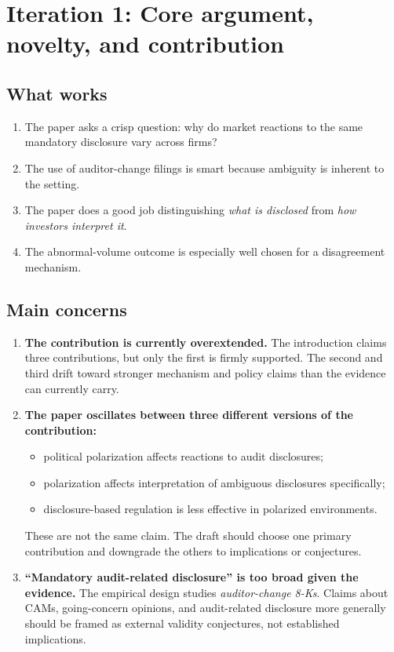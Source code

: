 \documentclass[11pt]{article}
\begin{document}
\section*{Iteration 1: Core argument, novelty, and contribution}

\subsection*{What works}
\begin{enumerate}
    \item The paper asks a crisp question: why do market reactions to the same mandatory disclosure vary across firms?
    \item The use of auditor-change filings is smart because ambiguity is inherent to the setting.
    \item The paper does a good job distinguishing \emph{what is disclosed} from \emph{how investors interpret it}.
    \item The abnormal-volume outcome is especially well chosen for a disagreement mechanism.
\end{enumerate}

\subsection*{Main concerns}
\begin{enumerate}
    \item \textbf{The contribution is currently overextended.} The introduction claims three contributions, but only the first is firmly supported. The second and third drift toward stronger mechanism and policy claims than the evidence can currently carry.
    \item \textbf{The paper oscillates between three different versions of the contribution:}
    \begin{itemize}
        \item political polarization affects reactions to audit disclosures;
        \item polarization affects interpretation of ambiguous disclosures specifically;
        \item disclosure-based regulation is less effective in polarized environments.
    \end{itemize}
    These are not the same claim. The draft should choose one primary contribution and downgrade the others to implications or conjectures.
    \item \textbf{``Mandatory audit-related disclosure'' is too broad given the evidence.} The empirical design studies \emph{auditor-change 8-Ks}. Claims about CAMs, going-concern opinions, and audit-related disclosure more generally should be framed as external validity conjectures, not established implications.
\end{enumerate}
\end{document}
